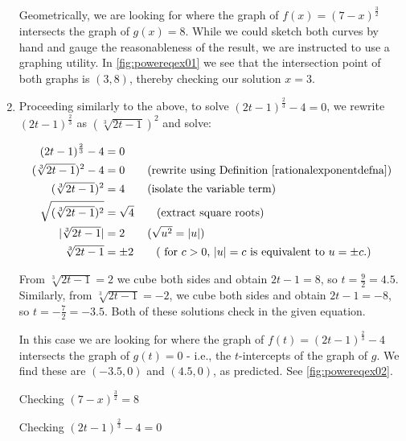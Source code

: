 \begin{ex}
\begin{enumerate}
Geometrically, we are looking for where the graph of $f(x) = (7-x)^{\frac{3}{2}}$ intersects the graph of $g(x) = 8$.  While we could sketch both curves by hand and gauge the reasonableness of the result, we are instructed to use a graphing utility.  In \autoref{fig:powereqex01} we see that the intersection point of both graphs is $(3,8)$, thereby checking our solution $x = 3$.

\item  Proceeding similarly to the above, to solve $(2t-1)^{\frac{2}{3}} -4 = 0$, we rewrite $(2t-1)^{\frac{2}{3}}$ as $(\sqrt[3]{2t-1})^2$ and solve:

\begin{align*}
(2t-1)^{\frac{2}{3}} -4  & = 0 \\
(\sqrt[3]{2t-1})^2 - 4 & = 0 \tag{rewrite using Definition \ref{rationalexponentdefna}} \\
(\sqrt[3]{2t-1})^2 & = 4 \tag{isolate the variable term} \\
\sqrt{(\sqrt[3]{2t-1})^2 } & = \sqrt{4} \tag{extract square roots} \\
|\sqrt[3]{2t-1}| & = 2 \tag{$\sqrt{u^2} = |u|$} \\
\sqrt[3]{2t-1} & = \pm 2 \tag{ for $c>0$, $|u| = c$ is equivalent to $u = \pm c$.}
\end{align*}

From $\sqrt[3]{2t-1}  = 2$ we cube both sides and obtain $2t-1 = 8$, so $t = \frac{9}{2} = 4.5$.  Similarly, from $\sqrt[3]{2t-1}  = -2$, we cube both sides and obtain $2t-1 = -8$, so $t = -\frac{7}{2} = -3.5$.  Both of these solutions check in the given equation.

In this case we are looking for where the graph of $f(t) = (2t-1)^{\frac{2}{3}} -4$ intersects the graph of $g(t) = 0$ - i.e., the $t$-intercepts of the graph of $g$.  We find these are $(-3.5,0)$ and $(4.5,0)$, as predicted. See \autoref{fig:powereqex02}.

\begin{mfigure}


\caption{Checking $(7-x)^{\frac{3}{2}} = 8$}
\label{fig:powereqex01}
\end{mfigure}

\begin{mfigure}
      

\caption{Checking  $(2t-1)^{\frac{2}{3}} -4 = 0$}
\label{fig:powereqex02}
\end{mfigure}


\end{enumerate}
\end{ex}
